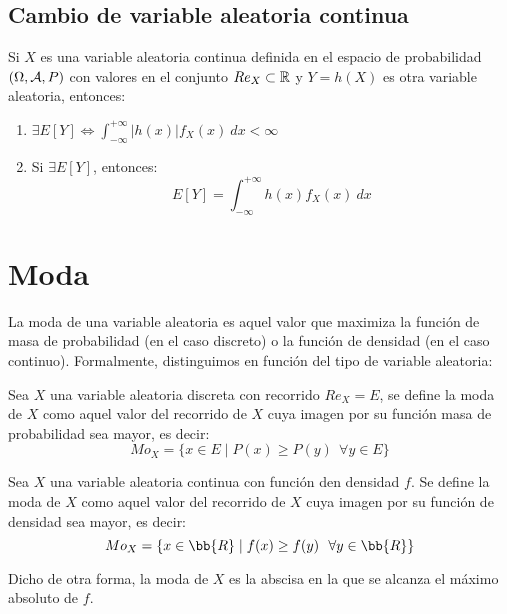 \subsection{Cambio de variable aleatoria continua}

\begin{teo}
    Si $X$ es una variable aleatoria continua definida en el espacio de probabilidad $(\Omega, \mathcal{A}, P)$ con valores en el conjunto $Re_X \subset \mathbb R$ y $Y=h(X)$ es otra variable aleatoria, entonces:
    \begin{enumerate}
        \item $\displaystyle \exists E[Y]\Longleftrightarrow \int_{-\infty}^{+\infty} |h(x)|f_X(x)~dx < \infty$
        \item Si $\displaystyle \exists E[Y]$, entonces:
        \begin{equation*}
            E[Y] = \int_{-\infty}^{+\infty} h(x)f_X(x)~dx
        \end{equation*}
    \end{enumerate}
\end{teo}

\section{Moda}

La moda de una variable aleatoria es aquel valor que maximiza la función de masa de probabilidad (en el caso discreto) o la función de densidad (en el caso continuo). Formalmente, distinguimos en función del tipo de variable aleatoria:
\begin{definicion}
    Sea $X$ una variable aleatoria discreta con recorrido $Re_X=E$, se define la moda de $X$ como aquel valor del recorrido de $X$ cuya imagen por su función masa de probabilidad sea mayor, es decir:
    $$Mo_X = \{x \in E \mid P(x) \geq P(y)~~\forall y \in E\}$$
\end{definicion}

\begin{definicion}
    Sea $X$ una variable aleatoria continua con función den densidad $f$. Se define la moda de $X$ como aquel valor del recorrido de $X$ cuya imagen por su función de densidad sea mayor, es decir:
    $$Mo_X = \{x \in \bb{R} \mid f(x) \geq f(y)~~\forall y \in \bb{R}\}$$
    
    Dicho de otra forma, la moda de $X$ es la abscisa en la que se alcanza el máximo absoluto de $f$.
\end{definicion}


